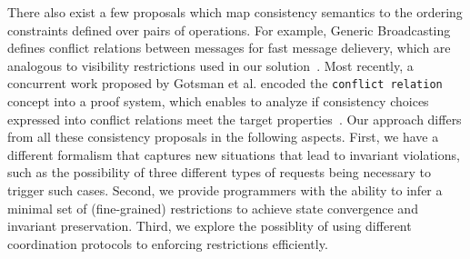 {There also exist a few proposals which map consistency semantics to 
the ordering constraints defined over pairs of operations. For example, Generic Broadcasting 
defines conflict relations between messages for fast message delievery,
which are analogous to visibility restrictions used in our solution~\cite{Pedone99genericbroadcast}. 
Most recently, a concurrent work proposed by Gotsman et al. 
encoded the {\tt conflict relation} concept into 
a proof system, which enables to analyze if consistency 
choices expressed into conflict relations
meet the target properties~\cite{GotsmanConsistencyReason}. Our approach differs from 
all these consistency proposals in the following aspects. First, we have a different formalism that 
captures new situations that lead to invariant violations, such as the 
possibility of three different types of requests being necessary to trigger such cases. Second, 
we provide programmers with the ability to infer a
minimal set of (fine-grained) restrictions to achieve state convergence
and invariant preservation. Third, we explore the possiblity of using different 
coordination protocols to enforcing restrictions efficiently.}{}

